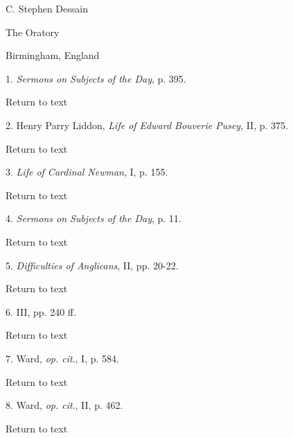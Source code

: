 C. Stephen Dessain

The Oratory

Birmingham, England






1. \emph{Sermons
on Subjects of the Day},
p. 395.

Return to text


2.
Henry Parry Liddon, \emph{Life of Edward Bouverie Pusey}, II, p. 375.

Return to text


3.
\emph{Life of Cardinal Newman}, I, p. 155.

Return to text


4.
\emph{Sermons on Subjects of the Day}, p. 11.

Return to text


5.
\emph{Difficulties of Anglicans}, II, pp. 20-22.

Return to text


6.
III, pp. 240 ff.

Return to text


7.
Ward, \emph{op. cit}., I, p. 584.

Return to text


8.
Ward, \emph{op. cit}., II, p. 462.

Return to text




